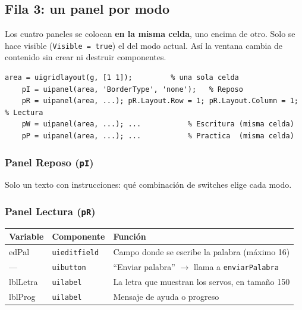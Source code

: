 \documentclass[11pt,a4paper]{article}
\newcommand{\cod}[1]{\texttt{#1}}
\begin{document}
\subsection{Fila 3: un panel por modo}
\begin{idea}
Los cuatro paneles se colocan \textbf{en la misma celda}, uno encima de otro. Solo
se hace visible (\cod{Visible = true}) el del modo actual. Así la ventana cambia
de contenido sin crear ni destruir componentes.
\end{idea}

\begin{lstlisting}[firstnumber=59]
    area = uigridlayout(g, [1 1]);         % una sola celda
    pI = uipanel(area, 'BorderType', 'none');   % Reposo
    pR = uipanel(area, ...); pR.Layout.Row = 1; pR.Layout.Column = 1;  % Lectura
    pW = uipanel(area, ...); ...           % Escritura (misma celda)
    pP = uipanel(area, ...); ...           % Practica  (misma celda)
\end{lstlisting}

\subsubsection{Panel Reposo (\texttt{pI})}
Solo un texto con instrucciones: qué combinación de switches elige cada modo.

\subsubsection{Panel Lectura (\texttt{pR})}
\begin{center}
\begin{tabular}{>{\ttfamily}l l >{\raggedright\arraybackslash}p{8cm}}
\toprule
\normalfont\textbf{Variable} & \textbf{Componente} & \textbf{Función} \\
\midrule
edPal & \cod{uieditfield} & Campo donde se escribe la palabra (máximo 16) \\
--- & \cod{uibutton} & ``Enviar palabra'' $\rightarrow$ llama a \cod{enviarPalabra} \\
lblLetra & \cod{uilabel} & La letra que muestran los servos, en tamaño 150 \\
lblProg & \cod{uilabel} & Mensaje de ayuda o progreso \\
\bottomrule
\end{tabular}
\end{center}
\end{document}
